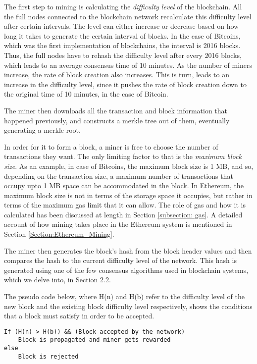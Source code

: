 \documentclass[english]{tktltiki}
\begin{document}
The first step to mining is calculating the \textit{difficulty level} of the blockchain. All the full nodes connected to the blockchain network recalculate this difficulty level after certain intervals. The level can either increase or decrease based on how long it takes to generate the certain interval of blocks. In the case of Bitcoins, which was the first implementation of blockchains, the interval is 2016 blocks. Thus, the full nodes have to rehash the difficulty level after every 2016 blocks, which leads to an average consensus time of 10 minutes. As the number of miners increase, the rate of block creation also increases. This is turn, leads to an increase in the difficulty level, since it pushes the rate of block creation down to the original time of 10 minutes, in the case of Bitcoin.

The miner then downloads all the transaction and block information that happened previously, and constructs a merkle tree out of them, eventually generating a merkle root. 

In order for it to form a block, a miner is free to choose the number of transactions they want. The only limiting factor to that is the \textit{maximum block size}. As an example, in case of Bitcoins, the maximum block size is 1 MB, and so, depending on the transaction size, a maximum number of transactions that occupy upto 1 MB space can be accommodated in the block. In Ethereum, the maximum block size is not in terms of the storage space it occupies, but rather in terms of the maximum gas limit that it can allow. The role of gas and how it is calculated has been discussed at length in Section \ref{subsection: gas}. A detailed account of how mining takes place in the Ethereum system is mentioned in Section \ref{Section:Ethereum_Mining}.

The miner then generates the block's hash from the block header values and then compares the hash to the current difficulty level of the network. This hash is generated using one of the few consensus algorithms used in blockchain systems, which we delve into, in Section 2.2.

The pseudo code below, where H(n) and H(b) refer to the difficulty level of the new block and the existing block difficulty level respectively, shows the conditions that a block must satisfy in order to be accepted.\newline

\begin{verbatim}
If (H(n) > H(b)) && (Block accepted by the network)
    Block is propagated and miner gets rewarded
else
    Block is rejected
\end{verbatim}
\end{document}
